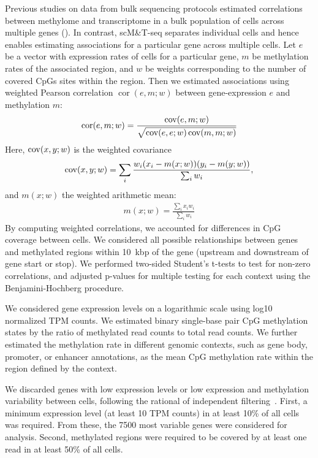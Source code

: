 Previous studies on data from bulk sequencing protocols estimated correlations between methylome and transcriptome in a bulk population of cells across multiple genes (). In contrast, scM\&T-seq separates individual cells and hence enables estimating associations for a particular gene across multiple cells. Let $e$ be a vector with expression rates of cells for a particular gene, $m$ be methylation rates of the associated region, and $w$ be weights corresponding to the number of covered CpGs sites within the region. Then we estimated associations using weighted Pearson correlation $\operatorname{cor}(e,m;w)$ between gene-expression $e$ and methylation $m$:
\begin{align} \label{eq:mt_wcor}
  \operatorname{cor}(e,m;w)=\frac{\operatorname{cov}(e,m;w)}{\sqrt{\operatorname{cov}(e,e;w)\operatorname{cov}(m,m;w)}}
\end{align}
Here, $\operatorname{cov}(x,y;w)$ is the weighted covariance
\begin{align}
  \operatorname{cov}(x,y;w)=\sum_i \frac{w_i (x_i-m(x;w))(y_i-m(y;w))}{\sum_i w_i },
\end{align}
and $m(x;w)$ the weighted arithmetic mean:
\begin{align}
  m(x;w)=\frac{\sum_i x_i w_i}{\sum_i w_i}
\end{align}
By computing weighted correlations, we accounted for differences in CpG coverage between cells. We considered all possible relationships between genes and methylated regions within 10~kbp of the gene (upstream and downstream of gene start or stop). We performed two-sided Student's t-tests to test for non-zero correlations, and adjusted p-values for multiple testing for each context using the Benjamini-Hochberg procedure.

We considered gene expression levels on a logarithmic scale using log10 normalized TPM counts. We estimated binary single-base pair CpG methylation states by the ratio of methylated read counts to total read counts. We further estimated the methylation rate in different genomic contexts, such as gene body, promoter, or enhancer annotations, as the mean CpG methylation rate within the region defined by the context.

We discarded genes with low expression levels or low expression and methylation variability between cells, following the rational of independent filtering~\citep{bourgon_independent_2010}. First, a minimum expression level (at least 10 TPM counts) in at least 10\% of all cells was required. From these, the 7500 most variable genes were considered for analysis. Second, methylated regions were required to be covered by at least one read in at least 50\% of all cells.


